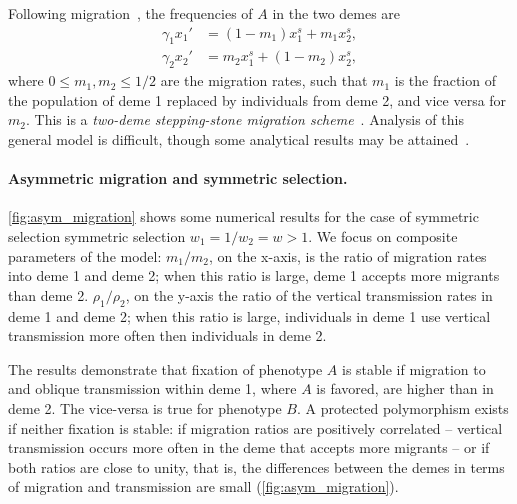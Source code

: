 \documentclass[14pt]{extarticle}
\begin{document}
Following migration~\citep{Karlin1981}, the frequencies of $A$ in the two demes are
\begin{equation} \label{eq:migration_model_migration}
\begin{aligned}
\gamma_1 x_1' &= (1-m_1) x_1^s + m_1 x_2^s, \\
\gamma_2 x_2' &= m_2 x_1^s + (1-m_2) x_2^s,
\end{aligned}
\end{equation}
where $0 \le m_1, m_2 \le 1/2$ are the migration rates, such that $m_1$ is the fraction of the population of deme 1 replaced by individuals from deme 2, and vice versa for $m_2$.
This is a \emph{two-deme stepping-stone migration scheme}~\citep[][eq.~2.17]{Karlin1982}.
Analysis of this general model is difficult, though some analytical results may be attained~\citep[see~Principle~6.1]{Karlin1982}.

\paragraph{Asymmetric migration and symmetric selection.}

\autoref{fig:asym_migration} shows some numerical results for the case of symmetric selection symmetric selection $w_1=1/w_2=w>1$.
We focus on composite parameters of the model:
$m_1/m_2$, on the x-axis, is the ratio of migration rates into deme 1 and deme 2; when this ratio is large, deme 1 accepts more migrants than deme 2.
$\rho_1/\rho_2$, on the y-axis the ratio of the vertical transmission rates in deme 1 and deme 2; when this ratio is large, individuals in deme 1 use vertical transmission more often then individuals in deme 2.

The results demonstrate that fixation of phenotype $A$ is stable if migration to and oblique transmission within deme 1, where $A$ is favored, are higher than in deme 2.
The vice-versa is true for phenotype $B$.
A protected polymorphism exists if neither fixation is stable: if migration ratios are positively correlated -- vertical transmission occurs more often in the deme that accepts more migrants -- or if both ratios are close to unity, that is, the differences between the demes in terms of migration and transmission are small (\autoref{fig:asym_migration}).
\end{document}

